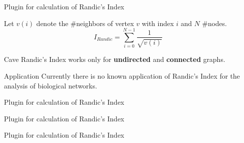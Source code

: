\begin{frame}{Plugin for calculation of Randic's Index}
\begin{definition}
Let $v(i)$ denote the \#neighbors of vertex $v$ with index $i$ and $N$ \#nodes.
\begin{equation}
I_{Randic} = \sum_{i=0}^{N-1} \frac{1}{\sqrt{v(i)}}
\end{equation}
\end{definition}
\begin{exampleblock}{Cave}
Randic's Index works only for \textbf{undirected} and \textbf{connected} graphs.
\end{exampleblock}
\pause
\begin{block}{Application}
Currently there is no known application of Randic's Index for the analysis of biological networks.
\end{block}
\end{frame}
\begin{frame}{Plugin for calculation of Randic's Index}

\end{frame}
\begin{frame}{Plugin for calculation of Randic's Index}

\end{frame}
\begin{frame}{Plugin for calculation of Randic's Index}

\end{frame}

